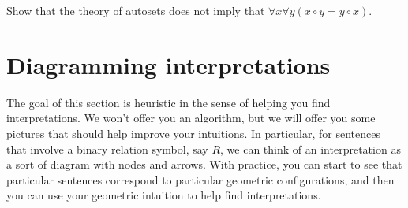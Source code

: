 \begin{exercise} Show that the theory of autosets does not imply that
  $\forall x\forall y(x\circ y=y\circ x)$.  \end{exercise}







\section{Diagramming interpretations}

The goal of this section is heuristic in the sense of helping you find
interpretations.  We won't offer you an algorithm, but we will offer
you some pictures that should help improve your intuitions.  In
particular, for sentences that involve a binary relation symbol, say
$R$, we can think of an interpretation as a sort of diagram with nodes
and arrows.  With practice, you can start to see that particular
sentences correspond to particular geometric configurations, and then
you can use your geometric intuition to help find interpretations.

